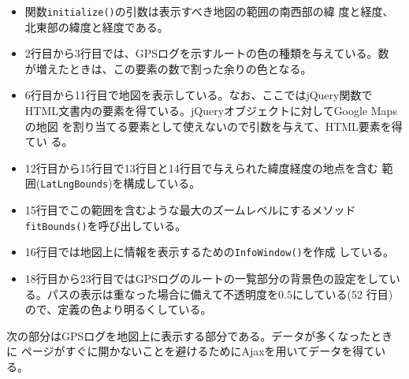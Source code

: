 \begin{itemize}
 \item 関数\texttt{initialize()}の引数は表示すべき地図の範囲の南西部の緯
       度と経度、北東部の緯度と経度である。
 \item 2行目から3行目では、GPSログを示すルートの色の種類を与えている。数
       が増えたときは、この要素の数で割った余りの色となる。
 \item 6行目から11行目で地図を表示している。なお、ここではjQuery関数で
       HTML文書内の要素を得ている。jQueryオブジェクトに対してGoogle Maps の地図
       を割り当てる要素として使えないので引数を与えて、HTML要素を得てい
       る。
 \item 12行目から15行目で13行目と14行目で与えられた緯度経度の地点を含む
       範囲(\texttt{LatLngBounds})を構成している。
 \item 15行目でこの範囲を含むような最大のズームレベルにするメソッド
       \texttt{fitBounds()}を呼び出している。
 \item 16行目では地図上に情報を表示するための\texttt{InfoWindow()}を作成
       している。
 \item 18行目から23行目ではGPSログのルートの一覧部分の背景色の設定をしてい
       る。パスの表示は重なった場合に備えて不透明度を$0.5$にしている(52
       行目)ので、定義の色より明るくしている。
\end{itemize}
次の部分はGPSログを地図上に表示する部分である。データが多くなったときに
ページがすぐに開かないことを避けるためにAjaxを用いてデータを得ている。

